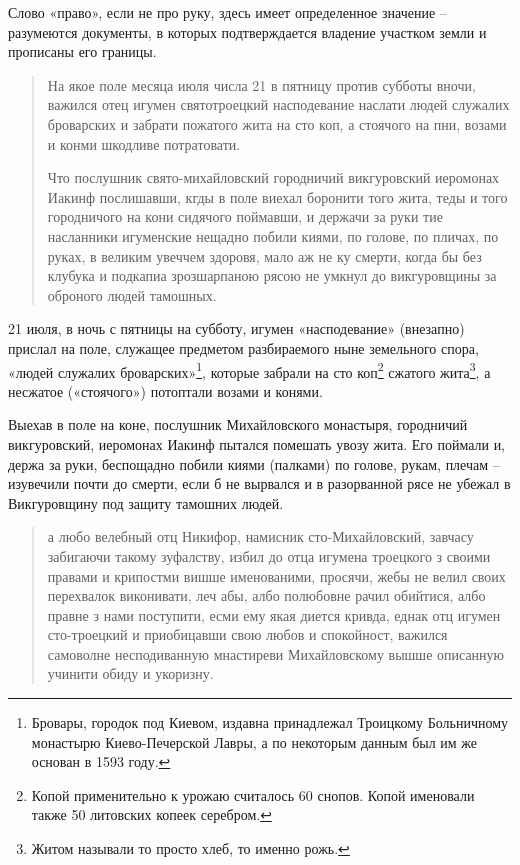 Слово «право», если не про руку, здесь имеет определенное значение – разумеются документы, в которых подтверждается владение участком земли и прописаны его границы.
 
\begin{quotation}
На якое поле месяца июля числа 21 в пятницу против субботы вночи, важился отец игумен святотроецкий насподевание наслати людей служалих броварских и забрати пожатого жита на сто коп, а стоячого на пни, возами и конми шкодливе потратовати.

Что послушник свято-михайловский городничий викгуровский иеромонах Иакинф послишавши, кгды в поле виехал боронити того жита, теды и того городничого на кони сидячого поймавши, и держачи за руки тие насланники игуменские нещадно побили киями, по голове, по пличах, по руках, в великим увеччем здоровя, мало аж не ку смерти, когда бы без клубука и подкапиа зрозшарпаною рясою не умкнул до викгуровщины за оброного людей тамошных.
\end{quotation} 

21 июля, в ночь с пятницы на субботу, игумен «насподевание» (внезапно) прислал на поле, служащее предметом разбираемого ныне земельного спора, «людей служалих броварских»\footnote{Бровары, городок под Киевом, издавна принадлежал Троицкому Больничному монастырю Киево-Печерской Лавры, а по некоторым данным был им же основан в 1593 году.}, которые забрали на сто коп\footnote{Копой применительно к урожаю считалось 60 снопов. Копой именовали также 50 литовских копеек серебром.} сжатого жита\footnote{Житом называли то просто хлеб, то именно рожь.}, а несжатое («стоячого») потоптали возами и конями. 

Выехав в поле на коне, послушник Михайловского монастыря, городничий викгуровский, иеромонах Иакинф пытался помешать увозу жита. Его поймали и, держа за руки, беспощадно побили киями (палками) по голове, рукам, плечам – изувечили почти до смерти, если б не вырвался и в разорванной рясе не убежал в Викгуровщину под защиту тамошних людей.

\begin{quotation}
а любо велебный отц Никифор, намисник сто-Ми\-хайловский, завчасу забигаючи такому зуфалству, избил до отца игумена троецкого з своими правами и крипостми вишше именованими, просячи, жебы не велил своих перехвалок виконивати, леч абы, албо полюбовне рачил обийтися, албо правне з нами поступити, есми ему якая диется кривда, еднак отц игумен сто-троецкий и приобицавши свою любов и спокойност, важился самоволне несподиванную мнастиреви Михайловскому вышше описанную учинити обиду и укоризну. 
\end{quotation}

